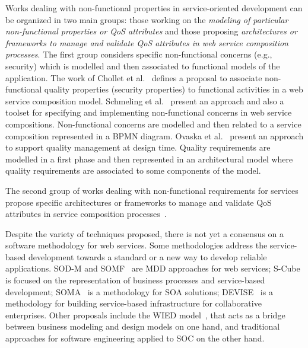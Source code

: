 \documentclass{llncs}
\theoremstyle{plain}
\theoremstyle{plain}
\theoremstyle{plain}
\begin{document}
Works dealing with non-functional properties in service-oriented 
development can be organized in two main groups: those working on the \textit{modeling 
of particular non-functional properties or QoS attributes} and those 
proposing \textit{architectures or frameworks to manage and 
validate QoS attributes in web service composition processes}. 
The first group considers specific non-functional concerns (e.g., security)
which is modelled and then associated to functional models of the application. 
The work of Chollet et al.~\cite{CholletL09} defines a proposal to associate non-functional 
quality properties (security properties) to functional activities in a web service composition model. Schmeling et al.~\cite{SchmelingCM11} present 
an approach and also a toolset for specifying and implementing non-functional 
concerns in web service compositions.
Non-functional concerns are modelled and then related to a service composition 
represented in a BPMN diagram. 
Ovaska et al.~\cite{OvaskaEHPA10} present an approach to 
support quality management at design time. 
Quality requirements are modelled in a first phase and then
represented in an architectural model where quality requirements are associated to some
components of the model. 



The second group of works dealing with non-functional requirements for services 
propose specific architectures or frameworks to manage and validate 
QoS attributes in service composition processes~\cite{XiaoCZBOLH08,Babamir2010,Karunamurthy2012787}. 

Despite the variety of techniques proposed, there is not yet a consensus on a software methodology 
for web services. 
Some methodologies address the service-based 
development towards a standard or a new way to develop reliable applications. 
SOD-M and SOMF~\cite{somf} are MDD approaches for web services; 
S-Cube~\cite{scube2010book} is focused on the representation of business processes and 
service-based development; SOMA~\cite{soma} is a methodology 
for SOA solutions; 
DEVISE~\cite{DEVISE} is a
methodology for building service-based infrastructure for collaborative
enterprises. 
Other proposals include the WIED model~\cite{TongrungrojanaL04}, 
that acts as a bridge between business modeling and design models on one hand, and traditional 
approaches for software engineering applied to SOC on the other hand.
\end{document}
